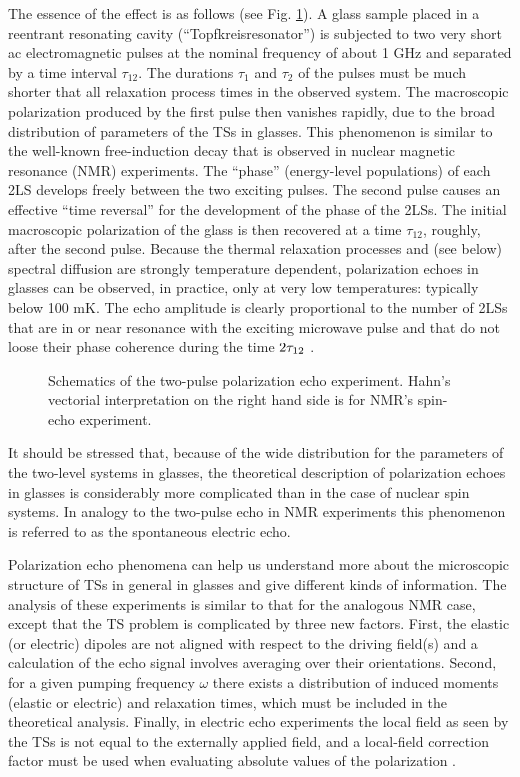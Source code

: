 \documentclass[10pt]{article}
\begin{document}
The essence of the effect is as follows (see Fig. \ref{image1-2e}). A glass sample 
placed in a reentrant resonating cavity (``Topfkreisresonator'') is subjected to two 
very short ac electromagnetic pulses at the nominal frequency of about 1 GHz 
and separated by a time interval $\tau_{12}$. The durations $\tau_1$ and 
$\tau_2$ of the pulses must be much shorter that all relaxation process times in 
the observed system. The macroscopic polarization produced by the first pulse 
then vanishes rapidly, due to the broad distribution of parameters of the TSs 
in glasses. This phenomenon is similar to the well-known free-induction decay 
that is observed in nuclear magnetic resonance (NMR) experiments. The ``phase'' 
(energy-level populations) of each 2LS develops freely between the two exciting 
pulses. The second pulse causes an effective ``time reversal'' for the 
development of the phase of the 2LSs. The initial macroscopic polarization of the 
glass is then recovered at a time $\tau_{12}$, roughly, after the second pulse. 
Because the thermal relaxation processes and (see below) spectral diffusion are 
strongly temperature dependent, polarization echoes in glasses can be observed, 
in practice, only at very low temperatures: typically below 100 mK. The echo 
amplitude is clearly proportional to the number of 2LSs that are in or near 
resonance with the exciting microwave pulse and that do not loose their phase 
coherence during the time $2\tau_{\rm 12}$ \cite{Phi1987}.
\begin{figure}[h]
\centering
\caption{ Schematics of the two-pulse polarization echo experiment. 
Hahn's vectorial interpretation on the right hand side is for NMR's spin-echo 
experiment.}
\label{image1-2e}
\end{figure}
It should be stressed that, because of the wide distribution for the parameters 
of the two-level systems in glasses, the theoretical description of polarization echoes 
in glasses is considerably more complicated than in the case of nuclear spin systems. 
In analogy to the two-pulse echo in NMR experiments this phenomenon is referred to 
as the spontaneous electric echo.

Polarization echo phenomena can help us understand more about the 
microscopic structure of TSs in general in glasses and give different kinds of 
information. The analysis of these experiments is similar to that for the 
analogous NMR case, except that the TS problem is complicated by three new 
factors. First, the elastic (or electric) dipoles are not aligned with respect to the 
driving field(s) and a calculation of the echo signal involves averaging over 
their orientations. 
Second, for a given pumping frequency $\omega$ there exists a distribution of 
induced moments (elastic or electric) and relaxation times, which must be included 
in the theoretical analysis. Finally, in electric echo experiments the local field as  
seen by the TSs is not equal to the externally applied field, and a local-field 
correction factor must be used when evaluating absolute values of the polarization
\cite{Phi1987}.
\end{document}
